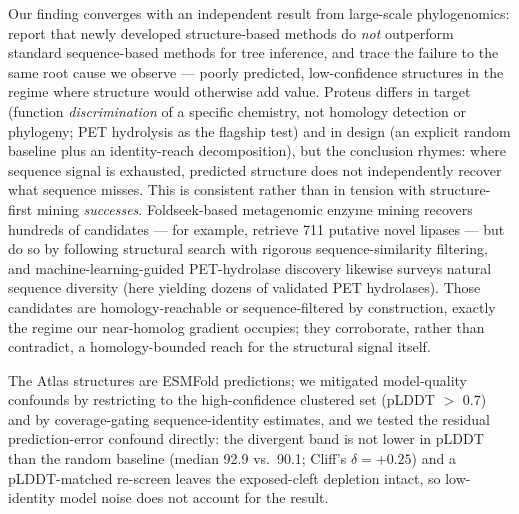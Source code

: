 Our finding converges with an independent result from large-scale phylogenomics:
\citet{mutti2025} report that newly developed structure-based methods do \emph{not}
outperform standard sequence-based methods for tree inference, and trace the failure
to the same root cause we observe --- poorly predicted, low-confidence structures in
the regime where structure would otherwise add value. Proteus differs in target
(function \emph{discrimination} of a specific chemistry, not homology detection or
phylogeny; PET hydrolysis as the flagship test) and in design (an explicit random
baseline plus an identity-reach decomposition), but the conclusion rhymes: where
sequence signal is exhausted, predicted structure does not independently recover what
sequence misses. This is consistent rather than in tension with structure-first
mining \emph{successes}. Foldseek-based metagenomic enzyme mining recovers hundreds of
candidates --- for example, \citet{jaito2026} retrieve 711 putative novel lipases ---
but do so by following structural search with rigorous sequence-similarity filtering,
and machine-learning-guided PET-hydrolase discovery \citep{nortonbaker2025} likewise
surveys natural sequence diversity (here yielding dozens of validated PET hydrolases).
Those candidates are homology-reachable or sequence-filtered by construction, exactly
the regime our near-homolog gradient occupies; they corroborate, rather than
contradict, a homology-bounded reach for the structural signal itself.



The Atlas structures are ESMFold predictions; we mitigated model-quality confounds by
restricting to the high-confidence clustered set (pLDDT $>$ 0.7) and by coverage-gating
sequence-identity estimates, and we tested the residual prediction-error confound
directly: the divergent band is not lower in pLDDT than the random baseline (median
92.9 vs.\ 90.1; Cliff's $\delta=+0.25$) and a
pLDDT-matched re-screen leaves the exposed-cleft depletion intact, so low-identity
model noise does not account for the result.


